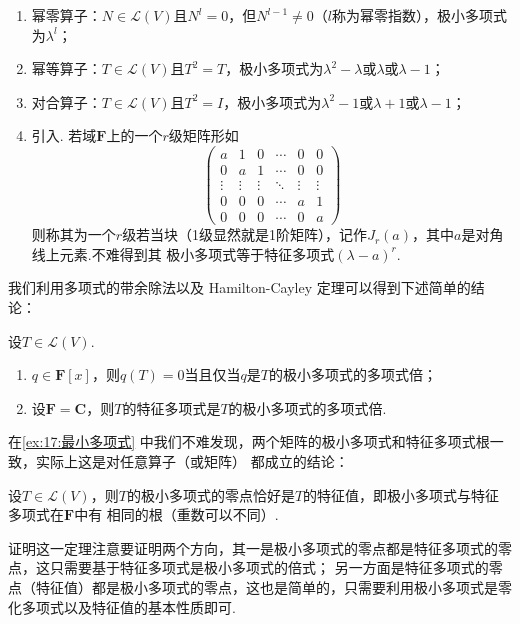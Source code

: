 \begin{enumerate}
    \item 幂零算子：$N\in \mathcal{L}(V)$且$N^l=0$，但$N^{l-1}\neq 0$（$l$称为幂零指数），极小多项式为$\lambda^l$；

    \item 幂等算子：$T\in \mathcal{L}(V)$且$T^2=T$，极小多项式为$\lambda^2-\lambda$或$\lambda$或$\lambda-1$；

    \item 对合算子：$T\in \mathcal{L}(V)$且$T^2=I$，极小多项式为$\lambda^2-1$或$\lambda+1$或$\lambda-1$；

    \item 引入. 若域$\mathbf{F}$上的一个$r$级矩阵形如\[\begin{pmatrix}
        a & 1 & 0 & \cdots & 0 & 0 \\
        0 & a & 1 & \cdots & 0 & 0 \\
        \vdots & \vdots & \vdots & \ddots & \vdots & \vdots \\
        0 & 0 & 0 & \cdots & a & 1 \\
        0 & 0 & 0 & \cdots & 0 & a
    \end{pmatrix}\]
    则称其为一个$r$级若当块（1级显然就是1阶矩阵），记作$J_r(a)$，其中$a$是对角线上元素.不难得到其
    极小多项式等于特征多项式$(\lambda-a)^r$.
\end{enumerate}

我们利用多项式的带余除法以及 Hamilton-Cayley 定理可以得到下述简单的结论：
\begin{theorem}
    设$T\in \mathcal{L}(V)$.
    \begin{enumerate}
        \item $q\in\mathbf{F}[x]$，则$q(T)=0$当且仅当$q$是$T$的极小多项式的多项式倍；

        \item 设$\mathbf{F}=\mathbf{C}$，则$T$的特征多项式是$T$的极小多项式的多项式倍.
    \end{enumerate}
\end{theorem}
在\autoref{ex:17:最小多项式} 中我们不难发现，两个矩阵的极小多项式和特征多项式根一致，实际上这是对任意算子（或矩阵）
都成立的结论：
\begin{theorem} \label{thm:17:极小多项式与特征多项式相同根}
    设$T\in \mathcal{L}(V)$，则$T$的极小多项式的零点恰好是$T$的特征值，即极小多项式与特征多项式在$\mathbf{F}$中有
    相同的根（重数可以不同）.
\end{theorem}
证明这一定理注意要证明两个方向，其一是极小多项式的零点都是特征多项式的零点，这只需要基于特征多项式是极小多项式的倍式；
另一方面是特征多项式的零点（特征值）都是极小多项式的零点，这也是简单的，只需要利用极小多项式是零化多项式以及特征值的基本性质即可.

